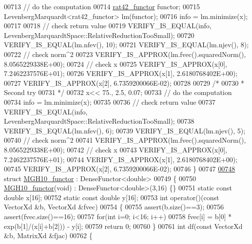 \begin{DoxyCode}
00713   \textcolor{comment}{// do the computation}
00714   \hyperlink{structrat42__functor}{rat42\_functor} functor;
00715   LevenbergMarquardt<rat42\_functor> lm(functor);
00716   info = lm.minimize(x);
00717 
00718   \textcolor{comment}{// check return value}
00719   VERIFY\_IS\_EQUAL(info, LevenbergMarquardtSpace::RelativeReductionTooSmall);
00720   VERIFY\_IS\_EQUAL(lm.nfev(), 10);
00721   VERIFY\_IS\_EQUAL(lm.njev(), 8);
00722   \textcolor{comment}{// check norm^2}
00723   VERIFY\_IS\_APPROX(lm.fvec().squaredNorm(), 8.0565229338E+00);
00724   \textcolor{comment}{// check x}
00725   VERIFY\_IS\_APPROX(x[0], 7.2462237576E+01);
00726   VERIFY\_IS\_APPROX(x[1], 2.6180768402E+00);
00727   VERIFY\_IS\_APPROX(x[2], 6.7359200066E-02);
00728 
00729   \textcolor{comment}{/*}
00730 \textcolor{comment}{   * Second try}
00731 \textcolor{comment}{   */}
00732   x<< 75., 2.5, 0.07;
00733   \textcolor{comment}{// do the computation}
00734   info = lm.minimize(x);
00735 
00736   \textcolor{comment}{// check return value}
00737   VERIFY\_IS\_EQUAL(info, LevenbergMarquardtSpace::RelativeReductionTooSmall);
00738   VERIFY\_IS\_EQUAL(lm.nfev(), 6);
00739   VERIFY\_IS\_EQUAL(lm.njev(), 5);
00740   \textcolor{comment}{// check norm^2}
00741   VERIFY\_IS\_APPROX(lm.fvec().squaredNorm(), 8.0565229338E+00);
00742   \textcolor{comment}{// check x}
00743   VERIFY\_IS\_APPROX(x[0], 7.2462237576E+01);
00744   VERIFY\_IS\_APPROX(x[1], 2.6180768402E+00);
00745   VERIFY\_IS\_APPROX(x[2], 6.7359200066E-02);
00746 \}
00747 
\hyperlink{struct_m_g_h10__functor}{00748} \textcolor{keyword}{struct }\hyperlink{struct_m_g_h10__functor}{MGH10\_functor} : DenseFunctor<double>
00749 \{
00750     \hyperlink{struct_m_g_h10__functor}{MGH10\_functor}(\textcolor{keywordtype}{void}) : DenseFunctor<double>(3,16) \{\}
00751     \textcolor{keyword}{static} \textcolor{keyword}{const} \textcolor{keywordtype}{double} x[16];
00752     \textcolor{keyword}{static} \textcolor{keyword}{const} \textcolor{keywordtype}{double} y[16];
00753     \textcolor{keywordtype}{int} operator()(\textcolor{keyword}{const} VectorXd &b, VectorXd &fvec)
00754     \{
00755         assert(b.size()==3);
00756         assert(fvec.size()==16);
00757         \textcolor{keywordflow}{for}(\textcolor{keywordtype}{int} i=0; i<16; i++)
00758             fvec[i] =  b[0] * exp(b[1]/(x[i]+b[2])) - y[i];
00759         \textcolor{keywordflow}{return} 0;
00760     \}
00761     \textcolor{keywordtype}{int} df(\textcolor{keyword}{const} VectorXd &b, MatrixXd &fjac)
00762     \{

\end{DoxyCode}
